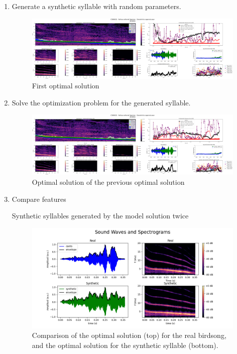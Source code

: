 \begin{enumerate}
    \item Generate a synthetic syllable with random parameters.
    
    \begin{figure}[H]
    \centering
    \includegraphics[width=\linewidth]{Images/1.png}
    \caption{First optimal solution}
    \label{fig:first_optimal}
    \end{figure}
    
    \item Solve the optimization problem for the generated syllable.
    
    \begin{figure}[H]
    \centering
    \includegraphics[width=\linewidth]{Images/2.png}
    \caption{Optimal solution of the previous optimal solution}
    \label{fig:second_optimal}
    \end{figure}
    
    
    \item Compare features
    
    Synthetic syllables generated by the model solution twice
    
    \begin{figure}[H]
    \centering
    \includegraphics[width=\linewidth]{Images/3.png}
    \caption{Comparison of the optimal solution (top) for the real birdsong, and the optimal solution for the synthetic syllable (bottom).}
    \label{fig:comparison_synth}
    \end{figure}
    
\end{enumerate}

